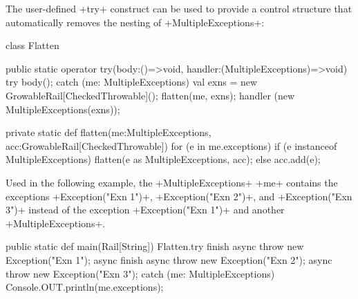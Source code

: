\begin{ex}
  The user-defined \xcd+try+ construct can be used to provide a
  control structure that automatically removes the nesting of
  \xcd+MultipleExceptions+:
\begin{xten}
class Flatten {

  public static operator try(body:()=>void,
                             handler:(MultipleExceptions)=>void) {
    try { body(); }
    catch (me: MultipleExceptions) {
      val exns = new GrowableRail[CheckedThrowable]();
      flatten(me, exns);
      handler (new MultipleExceptions(exns));
    }
  }

  private static def flatten(me:MultipleExceptions,
                             acc:GrowableRail[CheckedThrowable]) {
    for (e in me.exceptions) {
      if (e instanceof MultipleExceptions) {
        flatten(e as MultipleExceptions, acc);
      } else {
        acc.add(e);
      }
    }
  }
}
\end{xten}
%


  Used in the following example, the \xcd+MultipleExceptions+
  \xcd+me+ contains the exceptions \xcd+Exception("Exn 1")+,
  \xcd+Exception("Exn 2")+, and \xcd+Exception("Exn 3")+ instead of
  the exception \xcd+Exception("Exn 1")+ and another
  \xcd+MultipleExceptions+.
\begin{xten}
public static def main(Rail[String]) {
  Flatten.try {
    finish {
      async { throw new Exception("Exn 1"); }
      async finish {
        async { throw new Exception("Exn 2"); }
        async { throw new Exception("Exn 3"); }
      }
    }
  } catch (me: MultipleExceptions) {
    Console.OUT.println(me.exceptions);
  }
}
\end{xten}

\end{ex}

